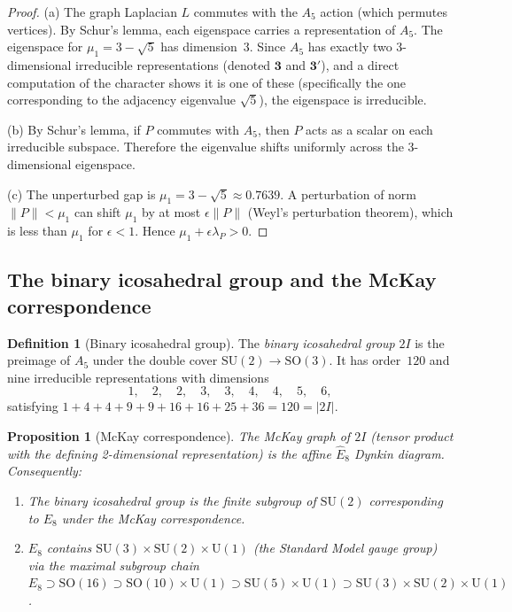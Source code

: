 \documentclass[12pt,a4paper]{article}
\newtheorem{proposition}[theorem]{Proposition}
\theoremstyle{definition}
\newtheorem{definition}[theorem]{Definition}
\theoremstyle{remark}
\newcommand{\SU}{\mathrm{SU}}
\newcommand{\SO}{\mathrm{SO}}
\newcommand{\UU}{\mathrm{U}}
\begin{document}
\begin{proof}
(a) The graph Laplacian $L$ commutes with the $A_5$ action (which permutes
    vertices).  By Schur's lemma, each eigenspace carries a representation
    of $A_5$.  The eigenspace for $\mu_1 = 3 - \sqrt{5}$ has
    dimension~3.  Since $A_5$ has exactly two 3-dimensional irreducible
    representations (denoted $\mathbf{3}$ and $\mathbf{3'}$), and a
    direct computation of the character shows it is one of these
    (specifically the one corresponding to the adjacency eigenvalue
    $\sqrt{5}$), the eigenspace is irreducible.

(b) By Schur's lemma, if $P$ commutes with $A_5$, then $P$ acts as a
    scalar on each irreducible subspace.  Therefore the eigenvalue shifts
    uniformly across the 3-dimensional eigenspace.

(c) The unperturbed gap is $\mu_1 = 3 - \sqrt{5} \approx 0.7639$.  A
    perturbation of norm $\|P\| < \mu_1$ can shift $\mu_1$ by at most
    $\epsilon\|P\|$ (Weyl's perturbation theorem), which is less than
    $\mu_1$ for $\epsilon < 1$.  Hence $\mu_1 + \epsilon\lambda_P > 0$.
\end{proof}

\subsection{The binary icosahedral group and the McKay correspondence}%
\label{ssec:mckay}

\begin{definition}[Binary icosahedral group]\label{def:2I}
The \emph{binary icosahedral group} $2I$ is the preimage of $A_5$ under
the double cover $\SU(2) \to \SO(3)$.  It has order~$120$ and nine
irreducible representations with dimensions
\[
  1, \quad 2, \quad 2, \quad 3, \quad 3, \quad 4, \quad 4, \quad 5, \quad 6,
\]
satisfying $1 + 4 + 4 + 9 + 9 + 16 + 16 + 25 + 36 = 120 = |2I|$.
\end{definition}

\begin{proposition}[McKay correspondence]\label{prop:mckay}
The McKay graph of $2I$ (tensor product with the defining 2-dimensional
representation) is the \emph{affine} $\hat{E}_8$ Dynkin diagram.
Consequently:
\begin{enumerate}[label=\textup{(\alph*)}]
  \item The binary icosahedral group is the finite subgroup of $\SU(2)$
        corresponding to $E_8$ under the McKay correspondence.
  \item $E_8$ contains $\SU(3) \times \SU(2) \times \UU(1)$ (the Standard
        Model gauge group) via the maximal subgroup chain
        $E_8 \supset \SO(16) \supset \SO(10) \times \UU(1) \supset
        \SU(5) \times \UU(1) \supset \SU(3) \times \SU(2) \times \UU(1)$.
\end{enumerate}
\end{proposition}
\end{document}
